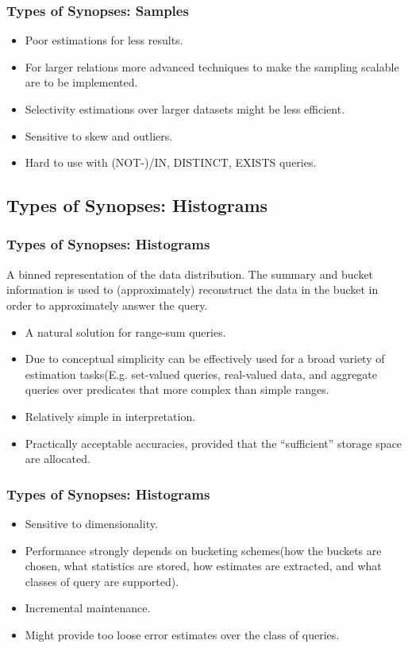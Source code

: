 \documentclass{beamer}
\begin{document}
\begin{frame}
\frametitle{Types of Synopses: Samples}
\begin{itemize}
\item{Poor estimations for less results.}
\item{For larger relations more advanced techniques to make the sampling scalable are to be implemented.}
\item{Selectivity estimations over larger datasets might be less efficient.}
\item{Sensitive to skew and outliers.}
\item{Hard to use with (NOT-)/IN, DISTINCT, EXISTS queries.}
\end{itemize}
\end{frame}

\subsection{Types of Synopses: Histograms}
\begin{frame}
\frametitle{Types of Synopses: Histograms}
A binned representation of the data distribution. The summary and bucket information is
used to (approximately) reconstruct the data in the bucket in order
to approximately answer the query.\pause
\vspace{0.2 cm}
\begin{itemize}
\item{A natural solution for range-sum queries.}
\item{Due to conceptual simplicity can be effectively used for a broad variety of estimation tasks(E.g. set-valued queries, real-valued data, and aggregate queries over predicates that more complex than simple ranges.}
\item{Relatively simple in interpretation.}
\item{Practically acceptable accuracies, provided that the “sufficient” storage space are allocated.}
\end{itemize}
\end{frame}

\begin{frame}
\frametitle{Types of Synopses: Histograms}
\begin{itemize}
\item{Sensitive to dimensionality.}
\item{Performance strongly depends on bucketing schemes(how the buckets are chosen, what statistics are stored, how estimates are extracted, and what classes of query are supported).}
\item{Incremental maintenance.}
\item{Might provide too loose error estimates over the class of queries.}
\end{itemize}
\end{frame}
\end{document}
